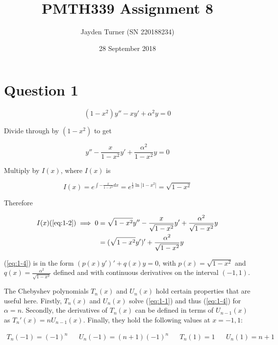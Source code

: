 \documentclass{article}
\title{PMTH339 Assignment 8}
\date{28 September 2018}
\author{Jayden Turner (SN 220188234)}
\begin{document}
\maketitle
{}

\section*{Question 1}

\begin{equation} \label{eq:1-1}
    (1 - x^2)y'' - xy' + \alpha^2y = 0
\end{equation}

Divide through by $(1 - x^2)$ to get

\begin{equation} \label{eq:1-2}
    y'' - \frac{x}{1 - x^2}y' + \frac{\alpha^2}{1 - x^2}y = 0
\end{equation}

Multiply by $I(x)$, where $I(x)$ is

\begin{equation} \label{eq:1-3}
    I(x) = e^{\int-\frac{x}{1 - x^2} dx}
        = e^{\frac{1}{2}\ln|1 - x^2|}
        = \sqrt{1 - x^2}
\end{equation}

Therefore

\begin{align}
    I(x)(\ref{eq:1-2}) \implies
    0 &= \sqrt{1 - x^2}y'' - \frac{x}{\sqrt{1 - x^2}}y' + \frac{\alpha^2}{\sqrt{1 - x^2}}y\nonumber\\
    &= (\sqrt{1 - x^2}y')' + \frac{\alpha^2}{\sqrt{1 - x^2}}y \label{eq:1-4}
\end{align}

(\ref{eq:1-4}) is in the form $(p(x)y')' + q(x)y = 0$, with $p(x) = \sqrt{1 - x^2}$ and
$q(x) = \frac{\alpha^2}{\sqrt{1 - x^2}}$ defined and with continuous derivatives on the interval
$(-1, 1)$.

\hfill\break
The Chebyshev polynomials $T_n(x)$ and $U_n(x)$ hold certain properties that are useful here.
Firstly, $T_n(x)$ and $U_n(x)$ solve (\ref{eq:1-1}) and thus (\ref{eq:1-4}) for $\alpha = n$.
Secondly, the derivatives of $T_n(x)$ can be defined in terms of $U_{n - 1}(x)$ as
$T_n'(x) = nU_{n - 1}(x)$. Finally, they hold the following values at $x = -1, 1$:

\begin{align} \label{eq:1-5}
    T_n(-1) = (-1)^n && U_n(-1) = (n + 1)(-1)^n && T_n(1) = 1 && U_n(1) = n + 1
\end{align}
\end{document}
